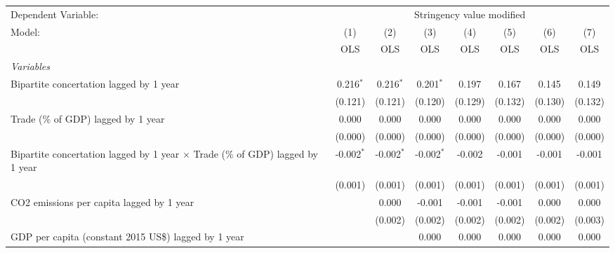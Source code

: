 
\begingroup
\centering
\begin{tabular}{lccccccc}
   \toprule
   Dependent Variable: & \multicolumn{7}{c}{Stringency value modified}\\
   Model:                                                                                & (1)          & (2)          & (3)          & (4)     & (5)     & (6)     & (7)\\  
                                                                                         &  OLS         & OLS          & OLS          & OLS     & OLS     & OLS     & OLS\\  
   \midrule
   \emph{Variables}\\
   Bipartite concertation lagged by 1 year                                               & 0.216$^{*}$  & 0.216$^{*}$  & 0.201$^{*}$  & 0.197   & 0.167   & 0.145   & 0.149\\   
                                                                                         & (0.121)      & (0.121)      & (0.120)      & (0.129) & (0.132) & (0.130) & (0.132)\\   
   Trade (\% of GDP) lagged by 1 year                                                    & 0.000        & 0.000        & 0.000        & 0.000   & 0.000   & 0.000   & 0.000\\   
                                                                                         & (0.000)      & (0.000)      & (0.000)      & (0.000) & (0.000) & (0.000) & (0.000)\\   
   Bipartite concertation lagged by 1 year $\times$ Trade (\% of GDP) lagged by 1 year   & -0.002$^{*}$ & -0.002$^{*}$ & -0.002$^{*}$ & -0.002  & -0.001  & -0.001  & -0.001\\   
                                                                                         & (0.001)      & (0.001)      & (0.001)      & (0.001) & (0.001) & (0.001) & (0.001)\\   
   CO2 emissions per capita lagged by 1 year                                             &              & 0.000        & -0.001       & -0.001  & -0.001  & 0.000   & 0.000\\   
                                                                                         &              & (0.002)      & (0.002)      & (0.002) & (0.002) & (0.002) & (0.003)\\   
   GDP per capita (constant 2015 US\$) lagged by 1 year                                  &              &              & 0.000        & 0.000   & 0.000   & 0.000   & 0.000\\   

\end{tabular}
